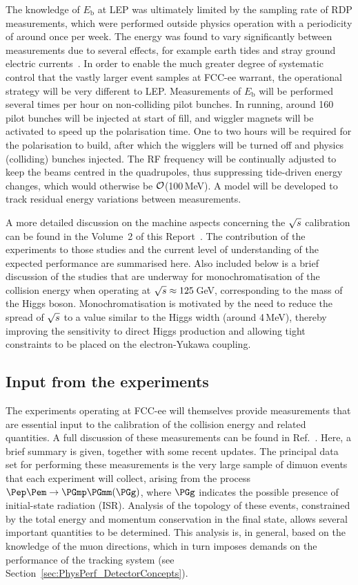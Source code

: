 The knowledge of $E_\mathrm{b}$ at LEP was ultimately limited by the sampling rate of RDP measurements, which were performed outside physics operation with a periodicity of around once per week. 
The energy was found to vary significantly between measurements due to several effects, for example earth tides and stray ground electric currents~\cite{Assmann:1998qb}. 
In order to enable the much greater degree of systematic control that the vastly larger event samples at FCC-ee warrant, the operational strategy will be very different to LEP. 
Measurements of $E_\mathrm{b}$ will be performed several times per hour on non-colliding pilot bunches. 
In \PZ running, around 160 pilot bunches will be injected at start of fill, and wiggler magnets will be activated to speed up the polarisation time. 
One to two hours will be required for the polarisation to build, after which the wigglers will be turned off and physics (colliding) bunches injected. 
The RF frequency will be continually adjusted to keep the beams centred in the quadrupoles, thus suppressing tide-driven energy changes, 
which would otherwise be $\cal{O}$(100\,MeV). 
A model will be developed to track residual energy variations between measurements.

A more detailed discussion on the machine aspects concerning the $\sqrt{s}$ calibration can be found in the Volume~2 of this Report~\cite{FCC-PED-FSR-Vol2}. 
The contribution of the experiments to those studies and the current level of understanding of the expected performance are summarised here.
Also included below is a brief discussion of the studies that are underway for monochromatisation of the collision energy when operating at $\sqrt{s} \approx 125$\,GeV, 
corresponding to the mass of the Higgs boson.  
Monochromatisation is motivated by the need to reduce the spread of $\sqrt{s}$ to a value similar to the Higgs width (around 4\,MeV), 
thereby improving the sensitivity to direct Higgs production and allowing tight constraints to be placed on the electron-Yukawa coupling.

\subsection{Input from the experiments}
\label{sec:EPOL_input_from_the_experiments}

The experiments operating at FCC-ee will themselves provide measurements that are essential input to the calibration of the collision energy and related quantities.  
A full discussion of these measurements can be found in Ref.~\cite{Blondel:2019jmp}.  
Here, a brief summary is given, together with some recent updates.
%
The principal data set for performing these measurements is the very large sample of dimuon events that each experiment will collect, 
arising from the process $\Pep\Pem \to \PGmp\PGmm (\PGg)$, where $\PGg$ indicates the possible presence of initial-state radiation (ISR).  
Analysis of the topology of these events, 
constrained by the total energy and momentum conservation in the final state, 
allows several important quantities to be determined. 
This analysis is, in general, based on the knowledge of the muon directions, 
which in turn imposes demands on the performance of the tracking system (see Section~\ref{sec:PhysPerf_DetectorConcepts}).


